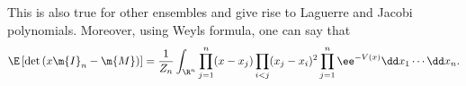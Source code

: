 This is also true for other ensembles and give rise to Laguerre and Jacobi polynomials. Moreover, using Weyls formula, one can say that
\begin{equation}
	\E\left[\det\left(x\m{I}_n - \m{M} \right) \right] = \frac{1}{Z_n}  \int_{\R^n} \prod_{j=1}^{n} (x - x_j) \prod_{i<j} (x_j - x_i)^2 \prod_{j=1}^{n} \ee^{-V(x)} \dd x_1 \cdots \dd x_n.
\end{equation}